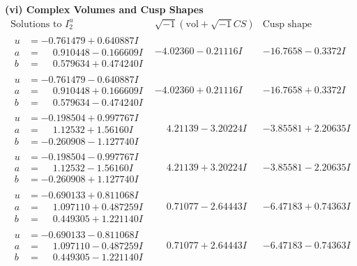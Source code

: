 \documentclass[1p]{elsarticle_modified}
\theoremstyle{definition}
\newcommand{\I}{\sqrt{-1}}
\begin{document}
\newpage\flushleft \textbf{(vi) Complex Volumes and Cusp Shapes}
$$\begin{array}{c|c|c}  
\text{Solutions to }I^u_{2}& \I (\text{vol} + \sqrt{-1}CS) & \text{Cusp shape}\\
 \hline 
\begin{aligned}
u &= -0.761479 + 0.640887 I \\
a &= \phantom{-}0.910448 - 0.166609 I \\
b &= \phantom{-}0.579634 + 0.474240 I\end{aligned}
 & -4.02360 - 0.21116 I & -16.7658 - 0.3372 I \\ \hline\begin{aligned}
u &= -0.761479 - 0.640887 I \\
a &= \phantom{-}0.910448 + 0.166609 I \\
b &= \phantom{-}0.579634 - 0.474240 I\end{aligned}
 & -4.02360 + 0.21116 I & -16.7658 + 0.3372 I \\ \hline\begin{aligned}
u &= -0.198504 + 0.997767 I \\
a &= \phantom{-}1.12532 + 1.56160 I \\
b &= -0.260908 - 1.127740 I\end{aligned}
 & \phantom{-}4.21139 - 3.20224 I & -3.85581 + 2.20635 I \\ \hline\begin{aligned}
u &= -0.198504 - 0.997767 I \\
a &= \phantom{-}1.12532 - 1.56160 I \\
b &= -0.260908 + 1.127740 I\end{aligned}
 & \phantom{-}4.21139 + 3.20224 I & -3.85581 - 2.20635 I \\ \hline\begin{aligned}
u &= -0.690133 + 0.811068 I \\
a &= \phantom{-}1.097110 + 0.487259 I \\
b &= \phantom{-}0.449305 + 1.221140 I\end{aligned}
 & \phantom{-}0.71077 - 2.64443 I & -6.47183 + 0.74363 I \\ \hline\begin{aligned}
u &= -0.690133 - 0.811068 I \\
a &= \phantom{-}1.097110 - 0.487259 I \\
b &= \phantom{-}0.449305 - 1.221140 I\end{aligned}
 & \phantom{-}0.71077 + 2.64443 I & -6.47183 - 0.74363 I \\ \hline\begin{aligned}

\end{aligned}
\end{array}$$
\end{document}
